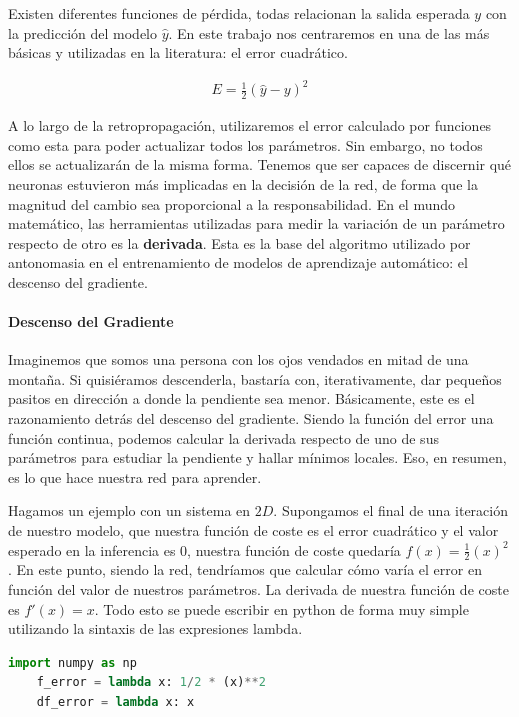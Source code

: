 Existen diferentes funciones de pérdida, todas relacionan la salida esperada $y$ con la predicción del modelo $\hat{y}$. En este trabajo nos centraremos en una de las más básicas y utilizadas en la literatura: el error cuadrático.

\begin{align}\label{f_error:cuadratico}
    E = \frac{1}{2}(\hat{y}-y)^2
\end{align}

A lo largo de la retropropagación, utilizaremos el error calculado por funciones como esta para poder actualizar todos los parámetros. Sin embargo, no todos ellos se actualizarán de la misma forma. Tenemos que ser capaces de discernir qué neuronas estuvieron más implicadas en la decisión de la red, de forma que la magnitud del cambio sea proporcional a la responsabilidad. En el mundo matemático, las herramientas utilizadas para medir la variación de un parámetro respecto de otro es la \textbf{derivada}. Esta es la base del algoritmo utilizado por antonomasia en el entrenamiento de modelos de aprendizaje automático: el descenso del gradiente.

\paragraph{Descenso del Gradiente} \label{sec:descenso_gradiente}

Imaginemos que somos una persona con los ojos vendados en mitad de una montaña. Si quisiéramos descenderla, bastaría con, iterativamente, dar pequeños pasitos en dirección a donde la pendiente sea menor. Básicamente, este es el razonamiento detrás del descenso del gradiente. Siendo la función del error una función continua, podemos calcular la derivada respecto de uno de sus parámetros para estudiar la pendiente y hallar mínimos locales. Eso, en resumen, es lo que hace nuestra red para aprender.

Hagamos un ejemplo con un sistema en $2D$. Supongamos el final de una iteración de nuestro modelo, que nuestra función de coste es el error cuadrático y el valor esperado en la inferencia es 0, nuestra función de coste quedaría $f(x) = \frac{1}{2}(x)^2$. En este punto, siendo la red, tendríamos que calcular cómo varía el error en función del valor de nuestros parámetros. La derivada de nuestra función de coste es $f'(x) = x$. Todo esto se puede escribir en python de forma muy simple utilizando la sintaxis de las expresiones lambda.

\begin{lstlisting}[language=Python,label=code:descenso_grad_2d_1]
	import numpy as np
	f_error = lambda x: 1/2 * (x)**2
	df_error = lambda x: x
\end{lstlisting}

